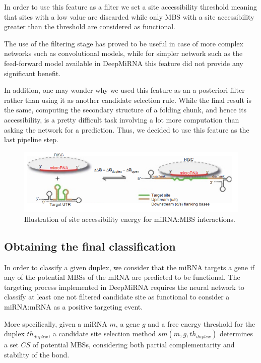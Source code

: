 In order to use this feature as a filter we set a site accessibility threshold meaning that sites with a low value are discarded while only MBS with a site accessibility greater than the threshold are considered as functional. 

The use of the filtering stage has proved to be useful in case of more complex networks such as convolutional models, while for simpler network such as the feed-forward model available in DeepMiRNA this feature did not provide any significant benefit.

In addition, one may wonder why we used this feature as an a-posteriori filter rather than using it as another candidate selection rule. While the final result is the same, computing the secondary structure of a folding chunk, and hence its accessibility, is a pretty difficult task involving a lot more computation than asking the network for a prediction. Thus, we decided to use this feature as the last pipeline step.

\begin{figure}[hbt!]
	\centering
	\includegraphics[width=1\textwidth]{Figures/site_accessibility}
	\caption{Illustration of site accessibility energy for miRNA:MBS interactions.}
	\label{fig:site_accessibility}
\end{figure}

\subsection{Obtaining the final classification} \label{sub:prediction}
In order to classify a given duplex, we consider that the miRNA targets a gene if any of the potential MBSs of the mRNA are predicted to be functional. The targeting process implemented in DeepMiRNA requires the neural network to classify at least one not filtered candidate site as functional to consider a miRNA:mRNA as a positive targeting event. 

More specifically, given a miRNA $m$, a gene $g$ and a free energy threshold for the duplex $th_{duplex}$, a candidate site selection method $sm(m,g, th_{duplex})$ determines a set $CS$ of potential MBSs, considering both partial complementarity and stability of the bond. 

